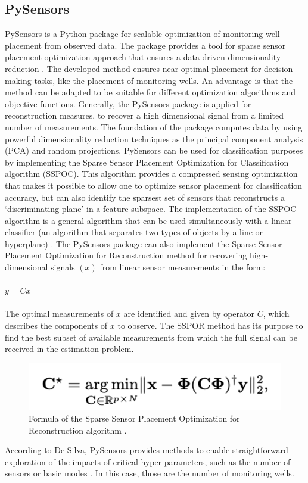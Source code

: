 \subsection{PySensors}
PySensors is a Python package for scalable optimization of monitoring well placement from observed data. The package provides a tool for sparse sensor placement optimization approach that ensures a data-driven dimensionality reduction \cite{manohar-2018}. The developed method ensures near optimal placement for decision-making tasks, like the placement of monitoring wells. An advantage is that the method can be adapted to be suitable for different optimization algorithms and objective functions. Generally, the PySensors package is applied for reconstruction measures, to recover a high dimensional signal from a limited number of measurements. The foundation of the package computes data by using powerful dimensionality reduction techniques as the principal component analysis (PCA) and random projections. PySensors can be used for classification purposes by implementing the Sparse Sensor Placement Optimization for Classification algorithm (SSPOC). This algorithm provides a compressed sensing optimization that makes it possible to allow one to optimize sensor placement for classification accuracy, but can also identify the sparsest set of sensors that reconstructs a ‘discriminating plane’ in a feature subspace. The implementation of the SSPOC algorithm is a general algorithm that can be used simultaneously with a linear classifier (an algorithm that separates two types of objects by a line or hyperplane) \cite{manohar-2018}. The PySensors package can also implement the Sparse Sensor Placement Optimization for Reconstruction method for recovering high-dimensional signals \((x)\) from linear sensor measurements in the form: \\
\\
\(y = Cx\)\\
\\
The optimal measurements of \(x\) are identified and given by operator \(C\), which describes the components of \(x\) to observe. The SSPOR method has its purpose to find the best subset of available measurements from which the full signal can be received in the estimation problem. 
\begin{figure}[htbp]
    \centering
    \includegraphics[width=0.5\linewidth]{appendix/pysensors.png}
    \caption{Formula of the Sparse Sensor Placement Optimization for Reconstruction algorithm \cite{manohar-2018}.}
    \label{Pysensors}
\end{figure}
According to De Silva, PySensors provides methods to enable straightforward exploration of the impacts of critical hyper parameters, such as the number of sensors or basic modes \cite{silva-2021}. In this case, those are the number of monitoring wells. 

